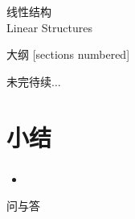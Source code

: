 \begin{standout}[第一章]
    线性结构\\
    Linear Structures
\end{standout}

\begin{frame}{大纲}
    [sections numbered]
    \tableofcontents
\end{frame}





\begin{standout}
    未完待续$\dots$
\end{standout}

\section{小结}

\begin{frame}
    \frametitle{\insertsectionhead}
    \begin{itemize}
        \item 
    \end{itemize}
\end{frame}

\begin{standout}[]
    问与答
\end{standout}